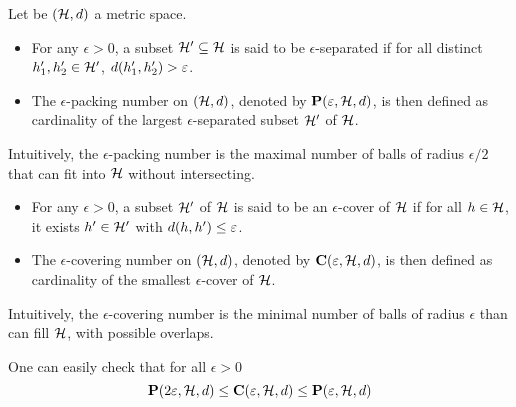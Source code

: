 \begin{tcolorbox}
    \begin{definition}
        Let be $(\mathcal{H}, d)$ a metric space. 
        \begin{itemize}
            \item For any $\epsilon> 0$, a subset $\mathcal{H}' \subseteq \mathcal{H}$ is said to be $\epsilon$-separated if for all distinct $h'_1, h'_2 \in \mathcal{H}'$, $d(h'_1, h'_2) > \varepsilon$.
            \item The $\epsilon$-packing number on $(\mathcal{H}, d)$, denoted by $\mathbf{P}(\varepsilon, \mathcal{H}, d)$, is then defined as cardinality of the largest $\epsilon$-separated subset $\mathcal{H}'$ of $\mathcal{H}$.
        \end{itemize}
        Intuitively, the $\epsilon$-packing number is the maximal number of balls of radius $\epsilon/2$ that can fit into $\mathcal{H}$ without intersecting.
        \begin{itemize}
            \item For any $\epsilon> 0$, a subset $\mathcal{H}'$ of $\mathcal{H}$ is said to be an $\epsilon$-cover of $\mathcal{H}$ if for all $h \in \mathcal{H}$, it exists $h' \in \mathcal{H}'$ with $d(h, h') \leq \varepsilon$.
            \item The $\epsilon$-covering number on $(\mathcal{H}, d)$, denoted by $\mathbf{C}(\varepsilon, \mathcal{H}, d)$, is then defined as cardinality of the smallest $\epsilon$-cover of $\mathcal{H}$.
        \end{itemize}
        Intuitively, the $\epsilon$-covering number is the minimal number of balls of radius $\epsilon$ than can fill $\mathcal{H}$, with possible overlaps.
    \end{definition}

    One can easily check that for all $\epsilon>0$
    \begin{equation}
        \mathbf{P}(2\varepsilon, \mathcal{H}, d) \leq \mathbf{C}(\varepsilon, \mathcal{H}, d) \leq \mathbf{P}(\varepsilon, \mathcal{H}, d)
    \end{equation}
\end{tcolorbox}





